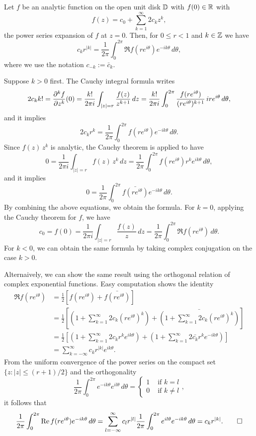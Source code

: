 \documentclass[12pt]{article}
\begin{document}
\begin{lem}
Let $f$ be an analytic function on the open unit disk $\D$ with $f(0)\in\R$ with
\[f(z)=c_0+\sum_{k=1}^\infty2c_kz^k,\]
the power series expansion of $f$ at $z=0$.
Then, for $0\le r<1$ and $k\in\Z$ we have
\[c_kr^{|k|}=\frac1{2\pi}\int_0^{2\pi}\Re f(re^{i\theta})e^{-ik\theta}\,d\theta,\]
where we use the notation $c_{-k}:=\bar c_k$.
\end{lem}
\begin{pf}
Suppose $k>0$ first.
The Cauchy integral formula writes
\begin{align*}
2c_kk!=\pd[k]{f}{z}(0)=\frac{k!}{2\pi i}\int_{|z|=r}\frac{f(z)}{z^{k+1}}\,dz=\frac{k!}{2\pi i}\int_0^{2\pi}\frac{f(re^{i\theta})}{(re^{i\theta})^{k+1}}\,ire^{i\theta}\,d\theta,
\end{align*}
and it implies
\[2c_kr^k=\frac1{2\pi}\int_0^{2\pi}f(re^{i\theta})e^{-ik\theta}\,d\theta.\]
Since $f(z)\,z^k$ is analytic, the Cauchy theorem is applied to have
\[0=\frac1{2\pi i}\int_{|z|=r}f(z)\,z^k\,dz=\frac1{2\pi}\int_0^{2\pi}f(re^{i\theta})r^ke^{ik\theta}\,d\theta,\]
and it implies
\[0=\frac1{2\pi}\int_0^{2\pi}\bar{f(re^{i\theta})}e^{-ik\theta}\,d\theta.\]
By combining the above equations, we obtain the formula.
For $k=0$, applying the Cauchy theorem for $f$, we have
\[c_0=f(0)=\frac1{2\pi i}\int_{|z|=r}\frac{f(z)}z\,dz=\frac1{2\pi}\int_0^{2\pi}\Re f(re^{i\theta})\,d\theta.\]
For $k<0$, we can obtain the same formula by taking complex conjugation on the case $k>0$.

Alternaively, we can show the same result using the orthogonal relation of complex exponential functions.
Easy computation shows the identity
\begin{align*}
\Re f(re^{i\theta})
&=\frac12[f(re^{i\theta})+\bar{f(re^{i\theta})}]\\
&=\frac12\left[\left(1+\sum_{k=1}^\infty2c_k(re^{i\theta})^k\right)+\bar{\left(1+\sum_{k=1}^\infty2c_k(re^{i\theta})^k\right)}\right]\\
&=\frac12\left[\left(1+\sum_{k=1}^\infty2c_kr^ke^{ik\theta}\right)+\left(1+\sum_{k=1}^\infty2\bar{c_k}r^ke^{-ik\theta}\right)\right]\\
&=\sum_{k=-\infty}^\infty c_kr^{|k|}e^{ik\theta}.
\end{align*}
From the uniform convergence of the power series on the compact set $\{z:|z|\le(r+1)/2\}$ and the orthogonality
\[\frac1{2\pi}\int_0^{2\pi}e^{-ik\theta}e^{il\theta}\,d\theta=\begin{cases}1&\text{ if }k=l\\0&\text{ if }k\ne l\end{cases},\]
it follows that
\[\frac1{2\pi}\int_0^{2\pi}\Re f(re^{i\theta})e^{-ik\theta}\,d\theta=\sum_{l=-\infty}^{\infty}c_lr^{|l|}\frac1{2\pi}\int_0^{2\pi}e^{il\theta}e^{-ik\theta}\,d\theta=c_kr^{|k|}.\qedhere\]
\end{pf}
\end{document}
